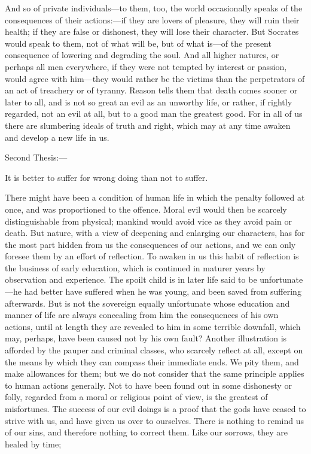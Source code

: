 \documentclass[11pt,letter]{article}
\begin{document}
\par  And so of private individuals—to them, too, the world occasionally speaks of the consequences of their actions:—if they are lovers of pleasure, they will ruin their health; if they are false or dishonest, they will lose their character. But Socrates would speak to them, not of what will be, but of what is—of the present consequence of lowering and degrading the soul. And all higher natures, or perhaps all men everywhere, if they were not tempted by interest or passion, would agree with him—they would rather be the victims than the perpetrators of an act of treachery or of tyranny. Reason tells them that death comes sooner or later to all, and is not so great an evil as an unworthy life, or rather, if rightly regarded, not an evil at all, but to a good man the greatest good. For in all of us there are slumbering ideals of truth and right, which may at any time awaken and develop a new life in us.

\par  Second Thesis:—

\par  It is better to suffer for wrong doing than not to suffer.

\par  There might have been a condition of human life in which the penalty followed at once, and was proportioned to the offence. Moral evil would then be scarcely distinguishable from physical; mankind would avoid vice as they avoid pain or death. But nature, with a view of deepening and enlarging our characters, has for the most part hidden from us the consequences of our actions, and we can only foresee them by an effort of reflection. To awaken in us this habit of reflection is the business of early education, which is continued in maturer years by observation and experience. The spoilt child is in later life said to be unfortunate—he had better have suffered when he was young, and been saved from suffering afterwards. But is not the sovereign equally unfortunate whose education and manner of life are always concealing from him the consequences of his own actions, until at length they are revealed to him in some terrible downfall, which may, perhaps, have been caused not by his own fault? Another illustration is afforded by the pauper and criminal classes, who scarcely reflect at all, except on the means by which they can compass their immediate ends. We pity them, and make allowances for them; but we do not consider that the same principle applies to human actions generally. Not to have been found out in some dishonesty or folly, regarded from a moral or religious point of view, is the greatest of misfortunes. The success of our evil doings is a proof that the gods have ceased to strive with us, and have given us over to ourselves. There is nothing to remind us of our sins, and therefore nothing to correct them. Like our sorrows, they are healed by time;
 
\end{document}
